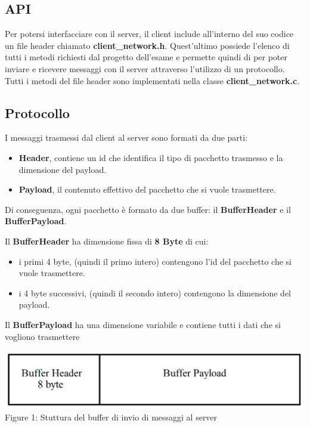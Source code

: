 \documentclass{article}
\begin{document}
\subsection{API}
Per potersi interfacciare con il server, il client include all'interno del suo codice un file header chiamato \textbf{client\_network.h}. Quest'ultimo possiede l'elenco di tutti i metodi
richiesti dal progetto dell'esame e permette quindi di per poter inviare e ricevere messaggi con il server attraverso l'utilizzo di un protocollo. Tutti i metodi del file header sono 
implementati nella classe \textbf{client\_network.c}.

\subsection{Protocollo}
I messaggi trasmessi dal client al server sono formati da due parti:
\begin{itemize}
    \itemsep 0em 
    \item \textbf{Header}, contiene un id che identifica il tipo di pacchetto trasmesso e la dimensione del payload.
    \item \textbf{Payload}, il contenuto effettivo del pacchetto che si vuole trasmettere.
\end{itemize}

Di conseguenza, ogni pacchetto è formato da due buffer: il \textbf{BufferHeader} e il \textbf{BufferPayload}.
\medskip 

Il \textbf{BufferHeader} ha dimensione fissa di \textbf{8 Byte} di cui:
\begin{itemize}
    \itemsep 0em 
    \item i primi 4 byte, (quindi il primo intero) contengono l'id del pacchetto che si vuole trasmettere.
    \item i 4 byte successivi, (quindi il secondo intero) contengono la dimensione del payload.
\end{itemize}

Il \textbf{BufferPayload} ha una dimensione variabile e contiene tutti i dati che si vogliono trasmettere

\begin{center}
    \includegraphics[width=\textwidth]{buffer}   
    Figure 1: Stuttura del buffer di invio di messaggi al server
\end{center}
\end{document}
